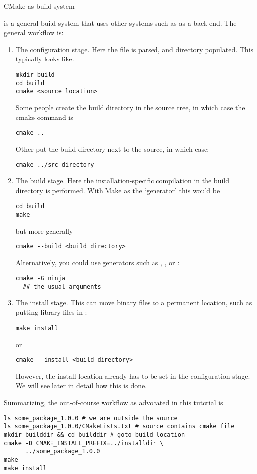  {CMake as build system}

 is a general build system that uses other systems
such as  as a back-end.
The general workflow is:
\begin{enumerate}
\item The configuration stage. Here the  file
  is parsed, and  directory populated. This typically looks like:
\begin{verbatim}
mkdir build
cd build
cmake <source location>
\end{verbatim}
Some people create the build directory in the source tree,
in which case the cmake command is
\begin{verbatim}
cmake ..
\end{verbatim}
Other put the build directory next to the source, in which case:
\begin{verbatim}
cmake ../src_directory
\end{verbatim}
\item The build stage. Here the installation-specific compilation
  in the build directory is performed.
  With Make as the `generator' this would be
\begin{verbatim}
cd build
make
\end{verbatim}
but more generally
\begin{verbatim}
cmake --build <build directory>
\end{verbatim}
Alternatively, you could use generators such as ,
, or :
\begin{verbatim}
cmake -G ninja
  ## the usual arguments
\end{verbatim}
\item The install stage. This can move binary files to a permanent
  location, such as putting library files in :
\begin{verbatim}
make install
\end{verbatim}
or 
\begin{verbatim}
cmake --install <build directory>
\end{verbatim}
However, the install location already has to be set in the configuration stage.
We will see later in detail how this is done.
\end{enumerate}

Summarizing, the out-of-course workflow as advocated in this tutorial is
\begin{verbatim}
ls some_package_1.0.0 # we are outside the source
ls some_package_1.0.0/CMakeLists.txt # source contains cmake file
mkdir builddir && cd builddir # goto build location
cmake -D CMAKE_INSTALL_PREFIX=../installdir \
      ../some_package_1.0.0
make
make install
\end{verbatim}

